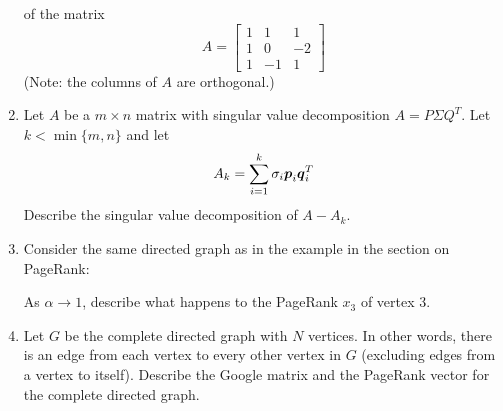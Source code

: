 \begin{enumerate}[leftmargin=*]
$$$$
of the matrix
$$
A = \left[ \begin{array}{rrr} 1 & 1 & 1 \\ 1 & 0 & -2 \\ 1 & -1 & 1 \end{array} \right]
$$
(Note: the columns of $A$ are orthogonal.)
\item Let $A$ be a $m \times n$ matrix with singular value decomposition $A = P \Sigma Q^T$. Let $k < \min\{m,n\}$ and let
$$
A_k = \sum_{i=1}^k \sigma_i \boldsymbol{p}_i \boldsymbol{q}_i^T
$$
Describe the singular value decomposition of $A - A_k$.
\item Consider the same directed graph as in the example in the section on PageRank:
\begin{center}
\end{center}
As $\alpha \to 1$, describe what happens to the PageRank $x_3$ of vertex 3.
\item Let $G$ be the complete directed graph with $N$ vertices. In other words, there is an edge from each vertex to every other vertex in $G$ (excluding edges from a vertex to itself). Describe the Google matrix and the PageRank vector for the complete directed graph.

\end{enumerate}
